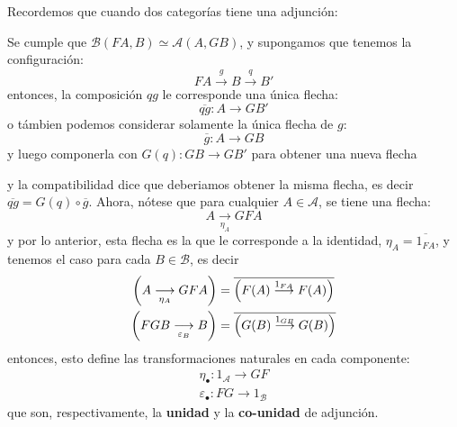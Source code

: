 Recordemos que cuando dos categorías tiene una adjunción:
\begin{center}
\end{center}
Se cumple que $\mathcal{B}(FA,B)\simeq\mathcal{A}(A,GB)$, y supongamos que tenemos la configuración:
\begin{equation*}
    FA\overset{g}{\longrightarrow}B\overset{q}{\longrightarrow}B'
\end{equation*}
entonces, la composición $qg$ le corresponde una única flecha:
\begin{equation*}
    \overline{qg}:A\longrightarrow GB'
\end{equation*}
o támbien podemos considerar solamente la única flecha de $g$:
\begin{equation*}
    \overline{g}:A\longrightarrow GB
\end{equation*}
y luego componerla con $G(q):GB\to GB'$ para obtener una nueva flecha
\begin{center}
\end{center}
y la compatibilidad dice que deberiamos obtener la misma flecha, es decir $\overline{qg}=G(q)\circ\overline{g}$.
Ahora, nótese que para cualquier $A\in\mathcal{A}$, se tiene una flecha:
\begin{equation*}
    A\underset{\eta_A}{\longrightarrow}GFA
\end{equation*}
y por lo anterior, esta flecha es la que le corresponde a la identidad, $\eta_A=\overline{1_{FA}}$, y tenemos el caso para  cada $B\in\mathcal{B}$, es decir
\begin{align*}
    \left({A\underset{\eta_A}{\longrightarrow}GFA}\right) & = \overline{\left({F(A)\overset{1_{FA}}{\longrightarrow}F(A)}\right)} \\
    \left({FGB\underset{\varepsilon_B}{\longrightarrow}B}\right) & = \overline{\left({G(B)\overset{1_{GB}}{\longrightarrow}G(B)}\right)}
\end{align*}
entonces, esto define las transformaciones naturales en cada componente:
\begin{align*}
    \eta_\bullet: 1_\mathcal{A}\longrightarrow GF \\
    \varepsilon_\bullet: FG\longrightarrow 1_\mathcal{B}
\end{align*}
que son, respectivamente, la \textbf{unidad} y la \textbf{co-unidad} de adjunción.

